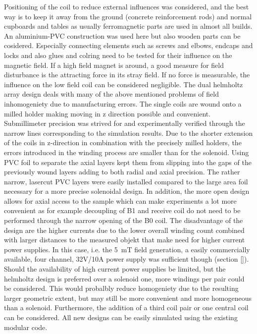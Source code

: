             Positioning of the coil to reduce external influences was considered, and the best way is to keep it away from the ground (concrete reinforcement rods) and normal cupboards and tables as usually ferromagnetic parts are used in almost all builds. An aluminium-PVC construction was used here but also wooden parts can be cosidered. Especially connecting elements such as screws and elbows, endcaps and locks and also glues and colring need to be tested for their influence on the magnetic field. If a high field magnet is around, a good measure for field disturbance is the attracting force in its stray field. If no force is measurable, the influence on the low field coil can be considered negligible.
            The dual helmholtz array design deals with many of the above mentioned problems of field inhomogeniety due to manufacturing errors. The single coils are wound onto a milled holder making moving in z direction possible and convenient. Submillimeter precision was strived for and experimentally verified through the narrow lines corresponding to the simulation results. Due to the shorter extension of the coils in z-direction in combination with the precisely milled holders, the errors introduced in the winding process are smaller than for the solenoid. Using PVC foil to separate the axial layers kept them from slipping into the gaps of the previously wound layers adding to both radial and axial precision. The rather narrow, lasercut PVC layers were easily installed compared to the large area foil necessary for a more precise solenoidal design.
            In addition, the more open design allows for axial access to the sample which can make experiments a lot more convenient as for example decoupling of B1 and receive coil do not need to be performed through the narrow opening of the B0 coil. The disadvantage of the design are the higher currents due to the lower overall winding count combined with larger distances to the measured objekt that make need for higher current power supplies. In this case, i.e. the \SI{5}{\milli\tesla} field generation, a easily commercially available, four channel, 32V/10A power supply was sufficient though (section \ref{}). Should the availability of high current power supplies be limited, but the helmholtz design is preferred over a solenoid one, more windings per pair could be considered. This would probalbly reduce homogeniety due to the resulting larger geometric extent, but may still be more convenient and more homogeneous than a solenoid. Furthermore, the addition of a third coil pair or one central coil can be considered. All new designs can be easily simulated using the existing modular code.
